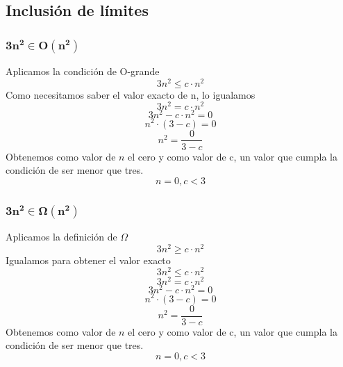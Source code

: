 \documentclass[10pt,a4paper,spanish]{report}
\theoremstyle{definition}
\theoremstyle{remark}
\begin{document}
\subsection{\textcolor[rgb]{0.1,0.2,1}Inclusión de límites}
\label{ejem_not}

\begin{multicols}{2}
\subsubsection{$\mathbf{3n^2 \in O(n^2)}$}

Aplicamos la condición de O-grande
\begin{displaymath}
3n^2 \leq c \cdot n^2
\end{displaymath}
Como necesitamos saber el valor exacto de n, lo igualamos
\begin{displaymath}
3n^2 = c \cdot n^2
\end{displaymath}
\begin{displaymath}
3n^2 - c \cdot n^2 = 0
\end{displaymath}
\begin{displaymath}
n^2 \cdot (3 - c) = 0
\end{displaymath}
\begin{displaymath}
n^2 = \frac{0}{3 - c}
\end{displaymath}
Obtenemos como valor de $n$ el cero y como valor de c, un valor que cumpla la condición de ser menor que tres.
\begin{displaymath}
n = 0, c < 3
\end{displaymath}

\subsubsection{$\mathbf{3n^2 \in \Omega(n^2)}$}

Aplicamos la definición de $\Omega$
\begin{displaymath}
3n^2 \geq c \cdot n^2
\end{displaymath}
Igualamos para obtener el valor exacto
\begin{displaymath}
3n^2 \leq c \cdot n^2
\end{displaymath}
\begin{displaymath}
3n^2 = c \cdot n^2
\end{displaymath}
\begin{displaymath}
3n^2 - c \cdot n^2 = 0
\end{displaymath}
\begin{displaymath}
n^2 \cdot (3 - c) = 0
\end{displaymath}
\begin{displaymath}
n^2 = \frac{0}{3 - c}
\end{displaymath}
Obtenemos como valor de $n$ el cero y como valor de c, un valor que cumpla la condición de ser menor que tres.
\begin{displaymath}
n = 0, c < 3
\end{displaymath}


\end{multicols}
\end{document}
